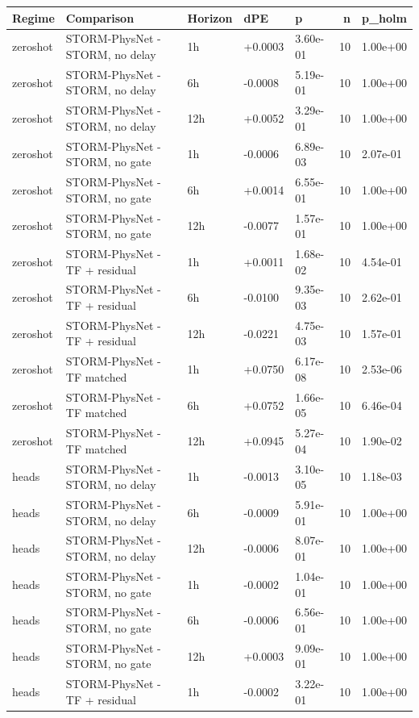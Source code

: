 \begin{tabular}{lllllrl}
\toprule
Regime & Comparison & Horizon & dPE & p & n & p\_holm \\
\midrule
zeroshot & STORM-PhysNet - STORM, no delay & 1h & +0.0003 & 3.60e-01 & 10 & 1.00e+00 \\
zeroshot & STORM-PhysNet - STORM, no delay & 6h & -0.0008 & 5.19e-01 & 10 & 1.00e+00 \\
zeroshot & STORM-PhysNet - STORM, no delay & 12h & +0.0052 & 3.29e-01 & 10 & 1.00e+00 \\
zeroshot & STORM-PhysNet - STORM, no gate & 1h & -0.0006 & 6.89e-03 & 10 & 2.07e-01 \\
zeroshot & STORM-PhysNet - STORM, no gate & 6h & +0.0014 & 6.55e-01 & 10 & 1.00e+00 \\
zeroshot & STORM-PhysNet - STORM, no gate & 12h & -0.0077 & 1.57e-01 & 10 & 1.00e+00 \\
zeroshot & STORM-PhysNet - TF + residual & 1h & +0.0011 & 1.68e-02 & 10 & 4.54e-01 \\
zeroshot & STORM-PhysNet - TF + residual & 6h & -0.0100 & 9.35e-03 & 10 & 2.62e-01 \\
zeroshot & STORM-PhysNet - TF + residual & 12h & -0.0221 & 4.75e-03 & 10 & 1.57e-01 \\
zeroshot & STORM-PhysNet - TF matched & 1h & +0.0750 & 6.17e-08 & 10 & 2.53e-06 \\
zeroshot & STORM-PhysNet - TF matched & 6h & +0.0752 & 1.66e-05 & 10 & 6.46e-04 \\
zeroshot & STORM-PhysNet - TF matched & 12h & +0.0945 & 5.27e-04 & 10 & 1.90e-02 \\
heads & STORM-PhysNet - STORM, no delay & 1h & -0.0013 & 3.10e-05 & 10 & 1.18e-03 \\
heads & STORM-PhysNet - STORM, no delay & 6h & -0.0009 & 5.91e-01 & 10 & 1.00e+00 \\
heads & STORM-PhysNet - STORM, no delay & 12h & -0.0006 & 8.07e-01 & 10 & 1.00e+00 \\
heads & STORM-PhysNet - STORM, no gate & 1h & -0.0002 & 1.04e-01 & 10 & 1.00e+00 \\
heads & STORM-PhysNet - STORM, no gate & 6h & -0.0006 & 6.56e-01 & 10 & 1.00e+00 \\
heads & STORM-PhysNet - STORM, no gate & 12h & +0.0003 & 9.09e-01 & 10 & 1.00e+00 \\
heads & STORM-PhysNet - TF + residual & 1h & -0.0002 & 3.22e-01 & 10 & 1.00e+00 \\

\end{tabular}
